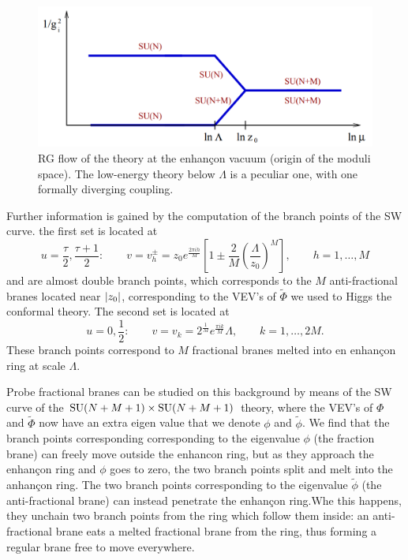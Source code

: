     \begin{figure}[H]
        \centering
        \includegraphics[scale=0.3]{Pictures/RGflow.png}
        \caption{RG flow of the theory at the enhançon vacuum (origin of the moduli space). The low-energy theory below $\Lambda$ is a peculiar one, with one formally diverging coupling.}
    \end{figure}

    Further information is gained by the computation of the branch points of the SW curve. the first set is located at
    \begin{equation}
        u=\frac{\tau}{2},\frac{\tau+1}{2}:\qquad v=v^\pm_h=z_0e^{\frac{2\pi i h}{M}}\left[ 1\pm \frac{2}{M}\left( \frac{\Lambda}{z_0} \right)^M \right],\qquad h=1,\dots,M
    \end{equation}
    and are almost double branch points, which corresponds to the $M$ anti-fractional branes located near $\abs{z_0}$, corresponding to the VEV's of $\tilde{\Phi}$ we used to Higgs the conformal theory. The second set is located at
    \begin{equation}
        u=0,\frac{1}{2}:\qquad v=v_k=2^{\frac{1}{M}}e^{\frac{\pi i k}{M}}\Lambda,\qquad k=1,\dots,2M.
    \end{equation}
    These branch points correspond to $M$ fractional branes melted into en enhançon ring at scale $\Lambda$.

    Probe fractional branes can be studied on this background by means of the SW curve of the $\text{SU}(N+M+1)\times\text{SU}(N+M+1)$ theory, where the VEV's of $\Phi$ and $\tilde{\Phi}$ now have an extra eigen value that we denote $\phi$ and $\tilde{\phi}$. We find that the branch points corresponding corresponding to the eigenvalue $\phi$ (the fraction brane) can freely move outside the enhancon ring, but as they approach the enhançon ring and $\phi$ goes to zero, the two branch points split and melt into the anhançon ring. The two branch points corresponding to the eigenvalue $\tilde{\phi}$ (the anti-fractional brane) can instead penetrate the enhançon ring.Whe this happens, they unchain two branch points from the ring which follow them inside: an anti-fractional brane eats a melted fractional brane from the ring, thus forming a regular brane free to move everywhere.


